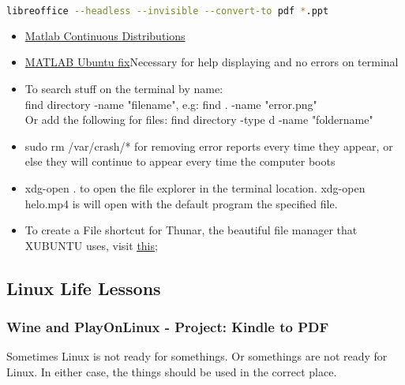 \begin{lstlisting}[language=Bash, basicstyle=\footnotesize]
    libreoffice --headless --invisible --convert-to pdf *.ppt
\end{lstlisting} 
\begin{itemize}
    \item \href{ https://nl.mathworks.com/help/stats/continuous-distributions.htm}{Matlab Continuous Distributions}
    
    
    \item \href{https://nl.mathworks.com/support/bugreports/1765886}{MATLAB Ubuntu fix}Necessary for help displaying and no errors on terminal
    
    \item To search stuff on the terminal by name: \\ 
    find directory -name "filename", e.g: find . -name "error.png"\\
    Or add the following for files: find directory -type d -name "foldername"
    
    
    \item sudo rm /var/crash/* \hspace{1cm}   for removing error reports every time they appear, or else they will continue to appear every time the computer boots
    
    
    \item xdg-open . \hspace{1cm} to open the file explorer in the terminal location. xdg-open helo.mp4  \hspace{.5cm} is will open with the default program the specified file.
    
    
    \item To create a File shortcut for Thunar, the beautiful file manager that XUBUNTU uses, visit \href{https://forum.xfce.org/viewtopic.php?id=9711}{\uline{this}};
\end{itemize}





\subsection{Linux Life Lessons}
\subsubsection{Wine and PlayOnLinux - Project: Kindle to PDF}
\par Sometimes Linux is not ready for somethings. Or somethings are not ready for Linux. In either case, the things should be used in the correct place.

